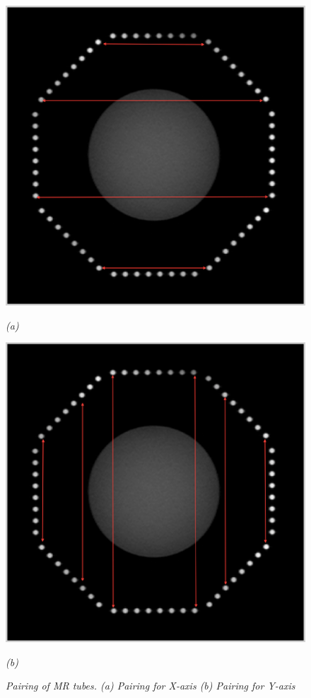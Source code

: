 \begin{figure}[htb]
  \begin{minipage}[b]{0.6\linewidth}
    \centering
    \centerline{\mbox{\includegraphics[width=0.6\linewidth]{parameters/images/tubes_pairing_x.eps}}}
    \centerline{\emph{(a)}}
  \end{minipage}
  \begin{minipage}[b]{0.6\linewidth}
    \centering
    \centerline{\mbox{\includegraphics[width=0.6\linewidth]{parameters/images/tubes_pairing_y.eps}}}
    \centerline{\emph{(b)}}
  \end{minipage}
  \caption{\emph{Pairing of MR tubes. (a) Pairing for X-axis (b) Pairing for Y-axis}}
  \label{fig:correction_tube_pairing_xy}
\end{figure}

